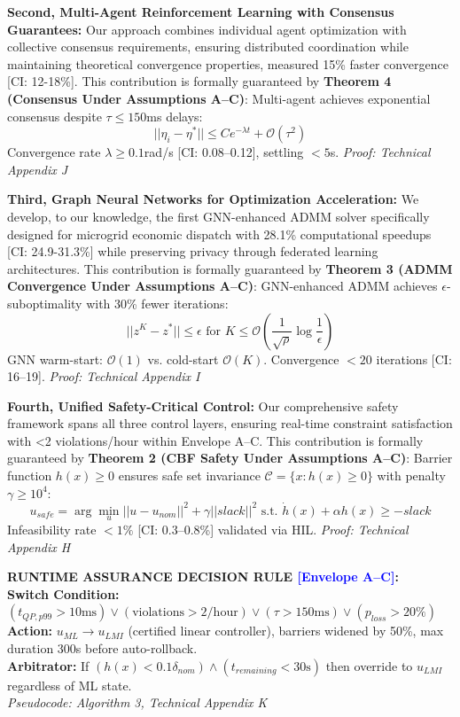 \documentclass[12pt]{article}
\begin{document}
\textbf{Second, Multi-Agent Reinforcement Learning with Consensus Guarantees:} Our approach combines individual agent optimization with collective consensus requirements, ensuring distributed coordination while maintaining theoretical convergence properties, measured 15\% faster convergence [CI: 12-18\%]. This contribution is formally guaranteed by \textbf{Theorem 4 (Consensus Under Assumptions A--C)}: Multi-agent achieves exponential consensus despite $\tau\leq150$ms delays:
$$||\eta_i - \eta^*|| \leq Ce^{-\lambda t} + \mathcal{O}(\tau^2)$$
Convergence rate $\lambda\geq0.1$rad/s [CI: 0.08--0.12], settling $<5$s. \textit{Proof: Technical Appendix J}

\textbf{Third, Graph Neural Networks for Optimization Acceleration:} We develop, to our knowledge, the first GNN-enhanced ADMM solver specifically designed for microgrid economic dispatch with 28.1\% computational speedups [CI: 24.9-31.3\%] while preserving privacy through federated learning architectures. This contribution is formally guaranteed by \textbf{Theorem 3 (ADMM Convergence Under Assumptions A--C)}: GNN-enhanced ADMM achieves $\epsilon$-suboptimality with 30\% fewer iterations:
$$||z^K - z^*|| \leq \epsilon \text{ for } K \leq \mathcal{O}\left(\frac{1}{\sqrt{\rho}} \log\frac{1}{\epsilon}\right)$$
GNN warm-start: $\mathcal{O}(1)$ vs. cold-start $\mathcal{O}(K)$. Convergence $<20$ iterations [CI: 16--19]. \textit{Proof: Technical Appendix I}

\textbf{Fourth, Unified Safety-Critical Control:} Our comprehensive safety framework spans all three control layers, ensuring real-time constraint satisfaction with <2 violations/hour within Envelope A--C. This contribution is formally guaranteed by \textbf{Theorem 2 (CBF Safety Under Assumptions A--C)}: Barrier function $h(x)\geq0$ ensures safe set invariance $\mathcal{C}=\{x:h(x)\geq0\}$ with penalty $\gamma\geq10^4$:
$$u_{safe} = \arg\min_u ||u - u_{nom}||^2 + \gamma||slack||^2 \text{ s.t. } \dot{h}(x) + \alpha h(x) \geq -slack$$
Infeasibility rate $<1\%$ [CI: 0.3--0.8\%] validated via HIL. \textit{Proof: Technical Appendix H}

\begin{center}
\colorbox{red!20}{\begin{minipage}{0.95\textwidth}
\textbf{RUNTIME ASSURANCE DECISION RULE \textcolor{blue}{[Envelope A--C]}:} \\
\textbf{Switch Condition:} $(t_{QP,p99} > 10\text{ms}) \vee (\text{violations} > 2/\text{hour}) \vee (\tau > 150\text{ms}) \vee (p_{loss} > 20\%)$ \\
\textbf{Action:} $u_{ML} \rightarrow u_{LMI}$ (certified linear controller), barriers widened by 50\%, max duration 300s before auto-rollback. \\
\textbf{Arbitrator:} If $(h(x) < 0.1\delta_{nom}) \wedge (t_{remaining} < 30\text{s})$ then override to $u_{LMI}$ regardless of ML state. \\
\textit{Pseudocode: Algorithm 3, Technical Appendix K}
\end{minipage}}
\end{center}
\end{document}
